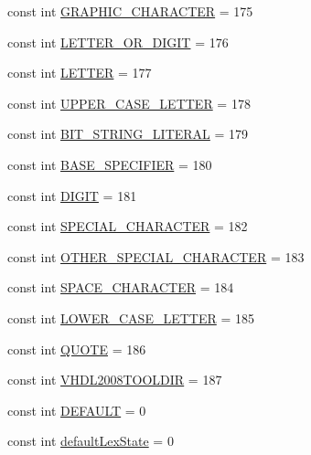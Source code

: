 \begin{DoxyCompactItemize}
$$\item 
const int \hyperlink{namespacevhdl_1_1parser_a45ce6a1bd1866403342fe68825963023}{G\+R\+A\+P\+H\+I\+C\+\_\+\+C\+H\+A\+R\+A\+C\+T\+E\+R} = 175
\item 
const int \hyperlink{namespacevhdl_1_1parser_aa6d8261aabc47ffdb6e4de51afb99dde}{L\+E\+T\+T\+E\+R\+\_\+\+O\+R\+\_\+\+D\+I\+G\+I\+T} = 176
\item 
const int \hyperlink{namespacevhdl_1_1parser_a91918a12fc4752180efaa6eb140ec5b4}{L\+E\+T\+T\+E\+R} = 177
\item 
const int \hyperlink{namespacevhdl_1_1parser_a2c72a10e0b57676bdedb59ea1afd615d}{U\+P\+P\+E\+R\+\_\+\+C\+A\+S\+E\+\_\+\+L\+E\+T\+T\+E\+R} = 178
\item 
const int \hyperlink{namespacevhdl_1_1parser_a630fb281032e8158361e7988987b2404}{B\+I\+T\+\_\+\+S\+T\+R\+I\+N\+G\+\_\+\+L\+I\+T\+E\+R\+A\+L} = 179
\item 
const int \hyperlink{namespacevhdl_1_1parser_a809de44767dc4bb4c0579ab6c7f2e4a9}{B\+A\+S\+E\+\_\+\+S\+P\+E\+C\+I\+F\+I\+E\+R} = 180
\item 
const int \hyperlink{namespacevhdl_1_1parser_a4e41e17b71a26559b75918af4a670273}{D\+I\+G\+I\+T} = 181
\item 
const int \hyperlink{namespacevhdl_1_1parser_a00b41dcd266524abde504c21f2fefb25}{S\+P\+E\+C\+I\+A\+L\+\_\+\+C\+H\+A\+R\+A\+C\+T\+E\+R} = 182
\item 
const int \hyperlink{namespacevhdl_1_1parser_a4c391e615a73f773284ff193be2e7d19}{O\+T\+H\+E\+R\+\_\+\+S\+P\+E\+C\+I\+A\+L\+\_\+\+C\+H\+A\+R\+A\+C\+T\+E\+R} = 183
\item 
const int \hyperlink{namespacevhdl_1_1parser_afc31ff392d103a6bb04fd649c21d8e2e}{S\+P\+A\+C\+E\+\_\+\+C\+H\+A\+R\+A\+C\+T\+E\+R} = 184
\item 
const int \hyperlink{namespacevhdl_1_1parser_a1b68252e0a1af5290f78760d32b923cb}{L\+O\+W\+E\+R\+\_\+\+C\+A\+S\+E\+\_\+\+L\+E\+T\+T\+E\+R} = 185
\item 
const int \hyperlink{namespacevhdl_1_1parser_ae266e91656cd2dcaf9fd6eb304e2d69e}{Q\+U\+O\+T\+E} = 186
\item 
const int \hyperlink{namespacevhdl_1_1parser_ae16a562f5a00a3807544d7257a32a87b}{V\+H\+D\+L2008\+T\+O\+O\+L\+D\+I\+R} = 187
\item 
const int \hyperlink{namespacevhdl_1_1parser_a66854f59b1822b212fcabd7b53431cf8}{D\+E\+F\+A\+U\+L\+T} = 0
\item 
const int \hyperlink{namespacevhdl_1_1parser_a4b964d37fab29489e30c2b3788a43a43}{default\+Lex\+State} = 0
\end{DoxyCompactItemize}


